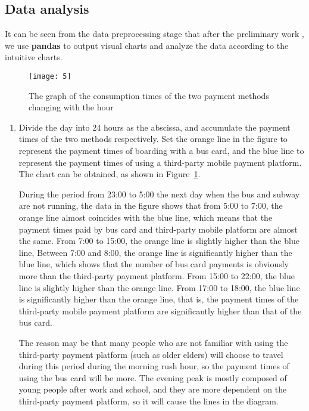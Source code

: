 \documentclass[../mcmpaper]{subfiles}
\begin{document}
\subsection{Data analysis}
It can be seen from the data preprocessing stage that after the preliminary work , we use \textbf{pandas} to output visual charts and analyze the data according to the intuitive charts.
\begin{figure}[!ht]
\centering
\texttt{[image: 5]}
\caption{The graph of the consumption times of the two payment methods changing with the hour}
\label{fig:5.1}
\end{figure}
\begin{enumerate}[label=\arabic*., format=\bfseries, itemindent=0pt, leftmargin=0pt, topsep=0pt, listparindent=\parindent, itemsep=1pt]
    \item Divide the day into 24 hours as the abscissa, and accumulate the payment times of the two methods respectively. Set the orange line in the figure to represent the payment times of boarding with a bus card, and the blue line to represent the payment times of using a third-party mobile payment platform. The chart can be obtained, as shown in Figure~\ref{fig:5.1}.
\par
During the period from 23:00 to 5:00 the next day when the bus and subway are not running, the data in the figure shows that from 5:00 to 7:00, the orange line almost coincides with the blue line, which means that the payment times paid by bus card and third-party mobile platform are almost the same. From 7:00 to 15:00, the orange line is slightly higher than the blue line, Between 7:00 and 8:00, the orange line is significantly higher than the blue line, which shows that the number of bus card payments is obviously more than the third-party payment platform. From 15:00 to 22:00, the blue line is slightly higher than the orange line. From 17:00 to 18:00, the blue line is significantly higher than the orange line, that is, the payment times of the third-party mobile payment platform are significantly higher than that of the bus card.
\par
The reason may be that many people who are not familiar with using the third-party payment platform (such as older elders) will choose to travel during this period during the morning rush hour, so the payment times of using the bus card will be more. The evening peak is mostly composed of young people after work and school, and they are more dependent on the third-party payment platform, so it will cause the lines in the diagram.
\begin{figure}[!ht]

\end{figure}
\end{enumerate}
\end{document}
